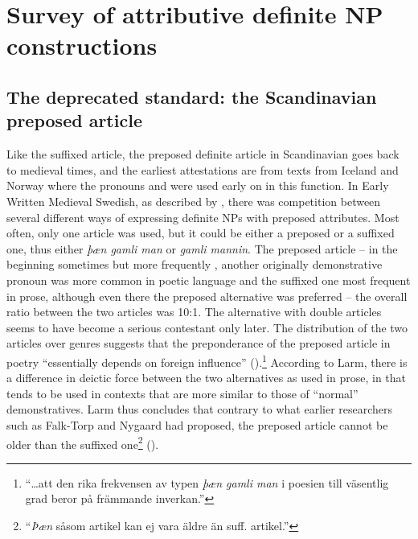 \section{\rmfamily Survey of attributive definite NP constructions}
\label{bkm:Ref224464037}\subsection{\rmfamily The deprecated standard: the Scandinavian preposed article}
\label{bkm:Ref154983973}\label{bkm:Ref154988501}
Like the suffixed article, the preposed definite article in Scandinavian goes back to medieval times, and the earliest attestations are from texts from Iceland and Norway where the pronouns and were used early on in this function. In Early Written Medieval Swedish, as described by \citet{Larm1936}, there was competition between several different ways of expressing definite NPs with preposed attributes. Most often, only one article was used, but it could be either a preposed or a suffixed one, thus either \textit{þæn gamli man} or \textit{gamli mannin}. The preposed article – in the beginning sometimes  but more frequently , another originally demonstrative pronoun was more common in poetic language and the suffixed one most frequent in prose, although even there the preposed alternative was preferred – the overall ratio between the two articles was 10:1. The alternative with double articles seems to have become a serious contestant only later. The distribution of the two articles over genres suggests that the preponderance of the preposed article in poetry “essentially depends on foreign influence” (\citet[68]{Larm1936}).\footnote{ “…att den rika frekvensen av typen \textit{þæn gamli man} i poesien till väsentlig grad beror på främmande inverkan.”} According to Larm, there is a difference in deictic force between the two alternatives as used in prose, in that  tends to be used in contexts that are more similar to those of “normal” demonstratives. Larm thus concludes that contrary to what earlier researchers such as Falk-Torp and Nygaard had proposed, the preposed article  cannot be older than the suffixed one\footnote{ “\textit{Þæn }såsom artikel kan ej vara äldre än suff. artikel.” } (\citet[64]{Larm1936}).

